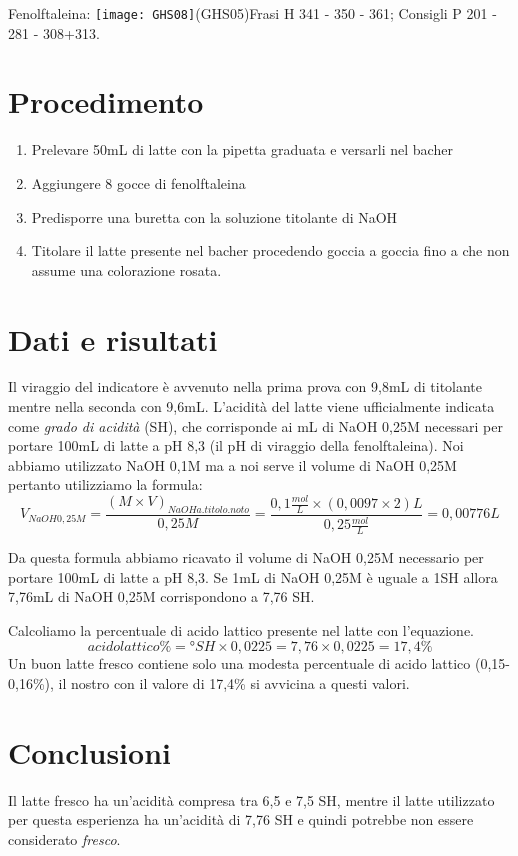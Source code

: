 \documentclass{article}
\begin{document}
Fenolftaleina: \texttt{[image: GHS08]}(GHS05)Frasi H	341 - 350 - 361; Consigli P	201 - 281 - 308+313.

\section{Procedimento}
\begin{enumerate}
    \item Prelevare 50mL di latte con la pipetta graduata e versarli nel bacher
    \item Aggiungere 8 gocce di fenolftaleina
    \item Predisporre una buretta con la soluzione titolante di NaOH
    \item Titolare il latte presente nel bacher procedendo goccia a goccia fino a che non assume una colorazione rosata. 
\end{enumerate}

\section{Dati e risultati}
Il viraggio del indicatore è avvenuto nella prima prova con 9,8mL di titolante mentre nella seconda con 9,6mL. L'acidità del latte viene ufficialmente indicata come \textit{grado di acidità} (\textdegree SH), che corrisponde ai mL di NaOH 0,25M necessari per portare 100mL di latte a pH 8,3 (il pH di viraggio della fenolftaleina). Noi abbiamo utilizzato NaOH 0,1M ma a noi serve il volume di NaOH 0,25M pertanto utilizziamo la formula:
\begin{equation}
V_{NaOH 0,25M} = \frac{(M \times V)_{NaOH a.titolo.noto}}{0,25M} = \frac{0,1\frac{mol}{L}\times (0,0097\times 2)L}{0,25\frac{mol}{L}} = 0,00776L
\end{equation}

Da questa formula abbiamo ricavato il volume di NaOH 0,25M necessario per portare 100mL di latte a pH 8,3. Se 1mL di NaOH 0,25M è uguale a 1\textdegree SH allora 7,76mL di NaOH 0,25M corrispondono a 7,76 \textdegree SH.

Calcoliamo la percentuale di acido lattico presente nel latte con l'equazione.
\begin{equation}
acido lattico\% = °SH \times 0,0225 = 7,76 \times 0,0225 = 17,4\%
\end{equation}
Un buon latte fresco contiene solo una modesta percentuale di acido lattico (0,15-0,16\%), il nostro con il valore di 17,4\% si avvicina a questi valori.
\section{Conclusioni}
Il latte fresco ha un'acidità compresa tra 6,5 e 7,5 \textdegree SH, mentre il latte utilizzato per questa esperienza ha un'acidità di 7,76 \textdegree SH e quindi potrebbe non essere considerato \textit{fresco}. 
\end{document}
